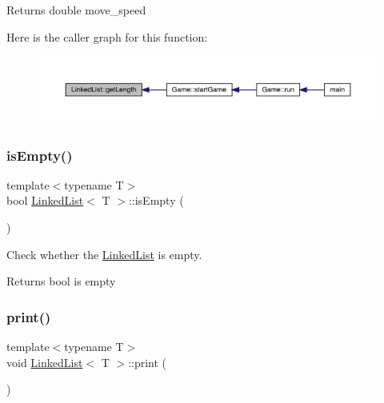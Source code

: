 \begin{DoxyReturn}{Returns}
double move\+\_\+speed 
\end{DoxyReturn}
Here is the caller graph for this function\+:\nopagebreak
\begin{figure}[H]
\begin{center}
\leavevmode
\includegraphics[width=350pt]{class_linked_list_ac650bde26cf5b3c074e2d59f97e0ff3b_icgraph}
\end{center}
\end{figure}
\mbox{\label{class_linked_list_a7ecbb28e82117a680839ed0dc28ebdce}} 
\subsubsection{\texorpdfstring{is\+Empty()}{isEmpty()}}
{\footnotesize\ttfamily template$<$typename T$>$ \\
bool \mbox{\hyperlink{class_linked_list}{Linked\+List}}$<$ T $>$\+::is\+Empty (\begin{DoxyParamCaption}{ }\end{DoxyParamCaption})\hspace{0.3cm}{\ttfamily [inline]}}



Check whether the \mbox{\hyperlink{class_linked_list}{Linked\+List}} is empty. 

\begin{DoxyReturn}{Returns}
bool is empty 
\end{DoxyReturn}
\mbox{\label{class_linked_list_a9675767b81fb9f1d8799444e4ee7f43b}} 
\subsubsection{\texorpdfstring{print()}{print()}}
{\footnotesize\ttfamily template$<$typename T$>$ \\
void \mbox{\hyperlink{class_linked_list}{Linked\+List}}$<$ T $>$\+::print (\begin{DoxyParamCaption}{ }\end{DoxyParamCaption})\hspace{0.3cm}{\ttfamily [inline]}}



